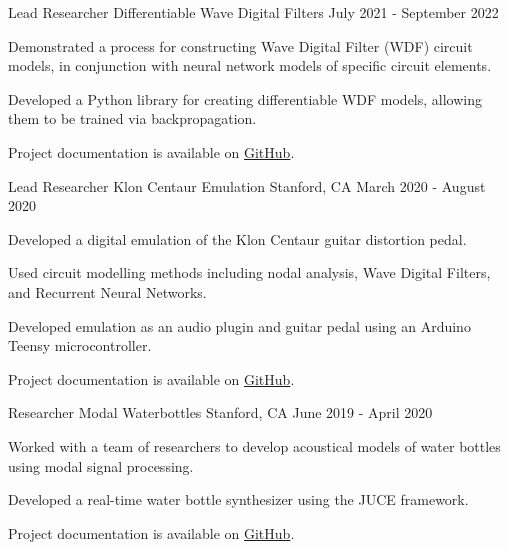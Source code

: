 \begin{cventries}
  \cventry
    {Lead Researcher} %
    {Differentiable Wave Digital Filters} %
    {} %
    {July 2021 - September 2022} %
    {
      \begin{cvitems} %
        \item {Demonstrated a process for constructing Wave Digital Filter (WDF) circuit models, in conjunction with neural network models of specific circuit elements.}
        \item {Developed a Python library for creating differentiable WDF models, allowing them to be trained via backpropagation.}
        \item {Project documentation is available on \href{https://github.com/jatinchowdhury18/differentiable-wdfs}{GitHub}.}
      \end{cvitems}
    }

  \cventry
    {Lead Researcher} %
    {Klon Centaur Emulation} %
    {Stanford, CA} %
    {March 2020 - August 2020} %
    {
      \begin{cvitems} %
        \item {Developed a digital emulation of the Klon Centaur guitar distortion pedal.}
        \item {Used circuit modelling methods including nodal analysis, Wave Digital Filters, and Recurrent Neural Networks.}
        \item {Developed emulation as an audio plugin and guitar pedal using an Arduino Teensy microcontroller.}
        \item {Project documentation is available on \href{https://github.com/jatinchowdhury18/KlonCentaur}{GitHub}.}
      \end{cvitems}
    }

  \cventry
    {Researcher} %
    {Modal Waterbottles} %
    {Stanford, CA} %
    {June 2019 - April 2020} %
    {
      \begin{cvitems} %
        \item {Worked with a team of researchers to develop acoustical
               models of water bottles using modal signal processing.}
        \item {Developed a real-time water bottle synthesizer using the JUCE framework.}
        \item {Project documentation is available on \href{https://github.com/jatinchowdhury18/modal-waterbottles}{GitHub}.}
      \end{cvitems}
    }


\end{cventries}
